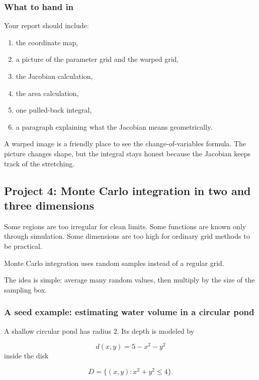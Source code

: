 \subsubsection*{What to hand in}

Your report should include:

\begin{enumerate}
\item the coordinate map,

\item a picture of the parameter grid and the warped grid,

\item the Jacobian calculation,

\item the area calculation,

\item one pulled-back integral,

\item a paragraph explaining what the Jacobian means geometrically.
\end{enumerate}

A warped image is a friendly place to see the change-of-variables formula.  The picture
changes shape, but the integral stays honest because the Jacobian keeps track of the
stretching.

\subsection{Project 4: Monte Carlo integration in two and three dimensions}

Some regions are too irregular for clean limits.  Some functions are known only through
simulation.  Some dimensions are too high for ordinary grid methods to be practical.

Monte Carlo integration uses random samples instead of a regular grid.

The idea is simple: average many random values, then multiply by the size of the
sampling box.

\subsubsection*{A seed example: estimating water volume in a circular pond}

A shallow circular pond has radius \(2\).  Its depth is modeled by

\[
    d(x,y)=5-x^2-y^2
\]
inside the disk

\[
    D=\{(x,y):x^2+y^2\le4\}.
\]

